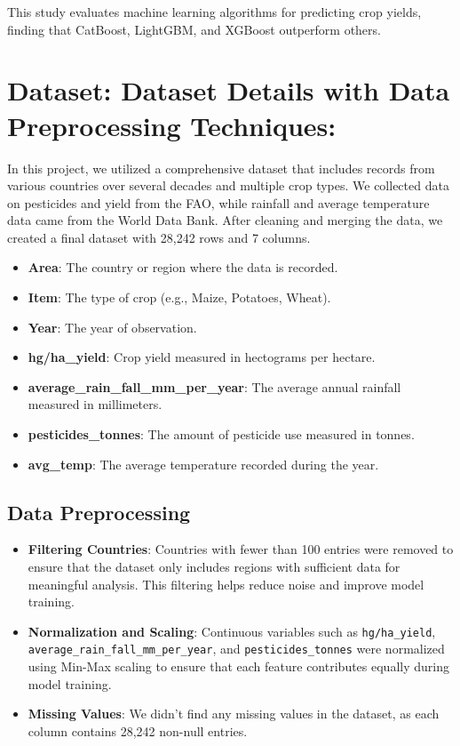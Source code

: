 \documentclass[10pt,twocolumn,letterpaper]{article}
\begin{document}
This study evaluates machine learning algorithms for predicting crop yields, finding that CatBoost, LightGBM, and XGBoost outperform others.



\section{Dataset: Dataset Details with Data Preprocessing Techniques:}
In this project, we utilized a comprehensive dataset that includes records from various countries over several decades and multiple crop types. We collected data on pesticides and yield from the FAO, while rainfall and average temperature data came from the World Data Bank. After cleaning and merging the data, we created a final dataset with 28,242 rows and 7 columns.
\begin{itemize}
    \item \textbf{Area}: The country or region where the data is recorded.
    \item \textbf{Item}: The type of crop (e.g., Maize, Potatoes, Wheat).
    \item \textbf{Year}: The year of observation.
    \item \textbf{hg/ha\_yield}: Crop yield measured in hectograms per hectare.
    \item \textbf{average\_rain\_fall\_mm\_per\_year}: The average annual rainfall measured in millimeters.
    \item \textbf{pesticides\_tonnes}: The amount of pesticide use measured in tonnes.
    \item \textbf{avg\_temp}: The average temperature recorded during the year.
\end{itemize}


\subsection{Data Preprocessing}
\begin{itemize}
    \item \textbf{Filtering Countries}: Countries with fewer than 100 entries were removed to ensure that the dataset only includes regions with sufficient data for meaningful analysis. This filtering helps reduce noise and improve model training.
    \item \textbf{Normalization and Scaling}: Continuous variables such as \texttt{hg/ha\_yield}, \texttt{average\_rain\_fall\_mm\_per\_year}, and \texttt{pesticides\_tonnes} were normalized using Min-Max scaling to ensure that each feature contributes equally during model training.
    \item \textbf{Missing Values}: We didn’t find any missing values in the dataset, as each column contains 28,242 non-null entries.
\end{itemize}
\end{document}
